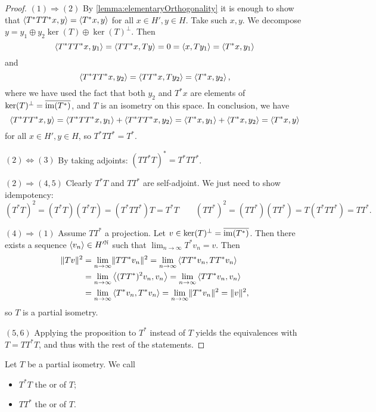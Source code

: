 \begin{proof}

$\boxed{(1)\Rightarrow (2)}$ By \ref{lemma:elementaryOrthogonality} it is enough to show that $\left\langle T^*TT^*x,y \right\rangle = \left\langle T^*x,y \right\rangle$ for all $x\in H', y\in H$. Take such $x,y$. We decompose $y = y_1\oplus y_2 \ker(T)\oplus \ker(T)^\perp$. Then
\[ \left\langle T^*TT^*x, y_1 \right\rangle = \left\langle TT^*x, Ty \right\rangle = 0 = \left\langle x,Ty_1 \right\rangle = \left\langle T^*x, y_1 \right\rangle \]
and
\[ \left\langle T^*TT^*x, y_2 \right\rangle = \left\langle TT^*x, Ty_2 \right\rangle = \left\langle T^*x,y_2 \right\rangle, \]
where we have used the fact that both $y_2$ and $T^*x$ are elements of $\ker(T)^\perp = \overline{\operatorname{im}(T^*)}$, and $T$ is an isometry on this space. In conclusion, we have
\[ \left\langle T^*TT^*x,y \right\rangle = \left\langle T^*TT^*x,y_1 \right\rangle + \left\langle T^*TT^*x,y_2 \right\rangle = \left\langle T^*x,y_1 \right\rangle + \left\langle T^*x,y_2 \right\rangle = \left\langle T^*x,y \right\rangle \]
for all $x\in H', y\in H$, so $T^*TT^* = T^*$.

$\boxed{(2) \Leftrightarrow (3)}$ By taking adjoints: $(TT^*T)^* = T^*TT^*$.

$\boxed{(2) \Rightarrow (4,5)}$ Clearly $T^*T$ and $TT^*$ are self-adjoint. We just need to show idempotency:
\[ (T^*T)^2 = (T^*T)(T^*T) = (T^*TT^*)T = T^*T \qquad (TT^*)^2 = (TT^*)(TT^*) = T(T^*TT^*) = TT^*. \]

$\boxed{(4) \Rightarrow (1)}$ Assume $TT^*$ a projection. Let $v\in \ker(T)^\perp = \overline{\operatorname{im}(T^*)}$. Then there exists a sequence $\langle v_n \rangle\in H^{\prime\mathbb{N}}$ such that $\lim_{n\to\infty}T^*v_n = v$. Then
\begin{align*}
\lVert Tv\rVert^2 &= \lim_{n\to\infty}\lVert TT^*v_n\rVert^2 = \lim_{n\to\infty}\left\langle TT^*v_n,TT^*v_n \right\rangle \\
&= \lim_{n\to\infty}\left\langle (TT^*)^2v_n,v_n \right\rangle = \lim_{n\to\infty}\left\langle TT^*v_n,v_n \right\rangle \\
&= \lim_{n\to\infty}\left\langle T^*v_n,T^*v_n \right\rangle = \lim_{n\to\infty}\lVert T^*v_n\rVert^2 = \lVert v\rVert^2,
\end{align*}
so $T$ is a partial isometry.

$\boxed{(5,6)}$ Applying the proposition to $T^*$ instead of $T$ yields the equivalences with $T=TT^*T$, and thus with the rest of the statements.


\end{proof}

\begin{definition}
Let $T$ be a partial isometry. We call
\begin{itemize}
\item $T^*T$ the  or  of $T$;
\item $TT^*$ the  or  of $T$.
\end{itemize}
\end{definition}


